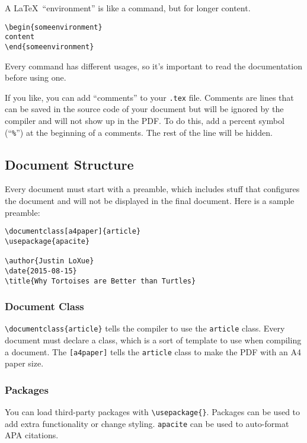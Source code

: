 \documentclass{chan}
\begin{document}
A \LaTeX\ ``environment'' is like a command, but for longer content.

\begin{lstlisting}
\begin{someenvironment}
content
\end{someenvironment}
\end{lstlisting}

Every command has different usages, so it's important to read the documentation before using one.

If you like, you can add ``comments'' to your \verb$.tex$ file.
Comments are lines that can be saved in the source code of your document but will be ignored by the compiler and will not show up in the PDF.
To do this, add a percent symbol (``\verb$%$'') at the beginning of a comments.
The rest of the line will be hidden.

\subsection{Document Structure}

Every document must start with a preamble, which includes stuff that configures the document and will not be displayed in the final document.
Here is a sample preamble:

\begin{lstlisting}
\documentclass[a4paper]{article}
\usepackage{apacite}

\author{Justin LoXue}
\date{2015-08-15}
\title{Why Tortoises are Better than Turtles}
\end{lstlisting}

\subsubsection{Document Class}

\lstinline$\documentclass{article}$ tells the compiler to use the \verb$article$ class.
Every document must declare a class, which is a sort of template to use when compiling a document.
The \verb$[a4paper]$ tells the \verb$article$ class to make the PDF with an A4 paper size.

\subsubsection{Packages}

You can load third-party packages with \lstinline$\usepackage{}$.
Packages can be used to add extra functionality or change styling.
\verb$apacite$ can be used to auto-format APA citations.
\end{document}
